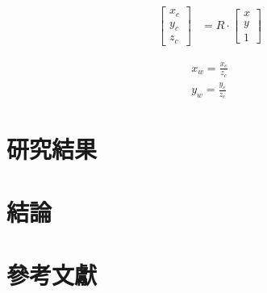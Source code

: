 \documentclass[12pt]{article}       %
\begin{document}
\begin{align}
    \begin{bmatrix}
        x_{c}   \\
        y_{c}   \\
        z_{c}        
    \end{bmatrix} 
     &=R\cdot
     \begin{bmatrix}
        x       \\
        y       \\
        1        
    \end{bmatrix} 
    \label{eq:xcyczc}
\end{align}

\begin{align}
    x_{w}=\frac{x_{c}}{z_{c}}
    \label{eq:xw}\\
    y_{w}=\frac{y_{c}}{z_{c}}
    \label{eq:yw}
\end{align}



\section{\centering 研究結果}





\section{\centering 結論} 




\section{\centering 參考文獻}
\vspace{-3.5em}  %
\renewcommand{\refname}{}  %
\printbibliography  %
\end{document}

